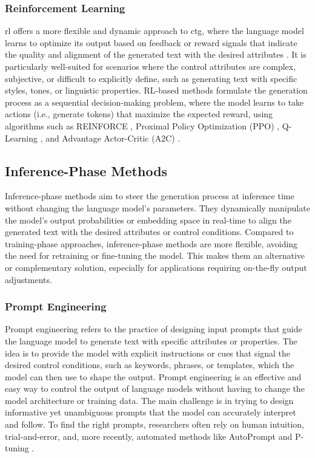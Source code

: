 \subsubsection{Reinforcement Learning}
\gls{rl} offers a more flexible and dynamic approach to \gls{ctg}, where the language model learns to optimize its output based on feedback or reward signals that indicate the quality and alignment of the generated text with the desired attributes \cite{liang2024controllabletextgenerationlarge}. 
It is particularly well-suited for scenarios where the control attributes are complex, subjective, or difficult to explicitly define, such as generating text with specific styles, tones, or linguistic properties. 
RL-based methods formulate the generation process as a sequential decision-making problem, where the model learns to take actions (i.e., generate tokens) that maximize the expected reward, using algorithms such as REINFORCE \cite{williams1992reinforce}, Proximal Policy Optimization (PPO) \cite{schulman2017ppo}, Q-Learning \cite{watkins1992qlearning}, and Advantage Actor-Critic (A2C) \cite{mnih2016a3c}.


\subsection{Inference-Phase Methods}
Inference-phase methods aim to steer the generation process at inference time without changing the language model's parameters.
They dynamically manipulate the model's output probabilities or embedding space in real-time to align the generated text with the desired attributes or control conditions.
Compared to training-phase approaches, inference-phase methods are more flexible, avoiding the need for retraining or fine-tuning the model.
This makes them an alternative or complementary solution, especially for applications requiring on-the-fly output adjustments.

\subsubsection{Prompt Engineering}
Prompt engineering refers to the practice of designing input prompts that guide the language model to generate text with specific attributes or properties. 
The idea is to provide the model with explicit instructions or cues that signal the desired control conditions, such as keywords, phrases, or templates, which the model can then use to shape the output.
Prompt engineering is an effective and easy way to control the output of language models without having to change the model architecture or training data.
The main challenge is in trying to design informative yet unambiguous prompts that the model can accurately interpret and follow.
To find the right prompts, researchers often rely on human intuition, trial-and-error, and, more recently, automated methods like AutoPrompt \cite{shin2022autoprompt} and P-tuning \cite{peng2022ptuning}.

